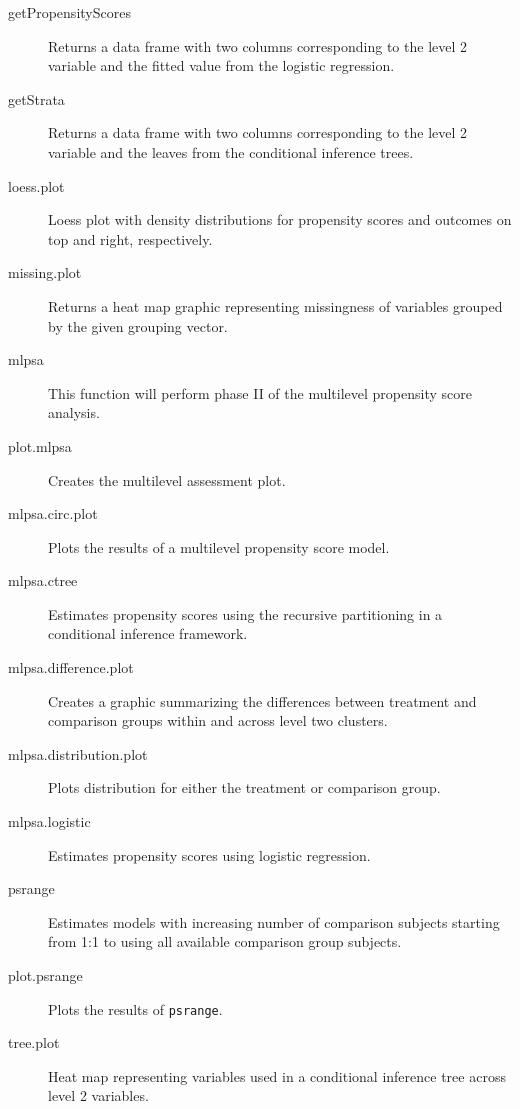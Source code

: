 \documentclass[letterpaper,12p,twoside]{article} %
\begin{document}
\renewcommand{\descriptionlabel}[1]{\hspace{\labelsep}\textbf{\texttt{#1}}}
\begin{description}
\item[getPropensityScores] Returns a data frame with two columns corresponding to the level 2 variable and the fitted value from the logistic regression.
\item[getStrata] Returns a data frame with two columns corresponding to the level 2 variable and the leaves from the conditional inference trees.
\item[loess.plot] Loess plot with density distributions for propensity scores and outcomes on top and right, respectively.
\item[missing.plot] Returns a heat map graphic representing missingness of variables grouped by the given grouping vector.
\item[mlpsa] This function will perform phase II of the multilevel propensity score analysis.
\item[plot.mlpsa] Creates the multilevel assessment plot.
\item[mlpsa.circ.plot] Plots the results of a multilevel propensity score model.
\item[mlpsa.ctree] Estimates propensity scores using the recursive partitioning in a conditional inference framework.
\item[mlpsa.difference.plot] Creates a graphic summarizing the differences between treatment and comparison groups within and across level two clusters.
\item[mlpsa.distribution.plot] Plots distribution for either the treatment or comparison group.
\item[mlpsa.logistic] Estimates propensity scores using logistic regression.
\item[psrange] Estimates models with increasing number of comparison subjects starting from 1:1 to using all available comparison group subjects.
\item[plot.psrange] Plots the results of \texttt{psrange}.
\item[tree.plot] Heat map representing variables used in a conditional inference tree across level 2 variables.
\end{description}
\end{document}
